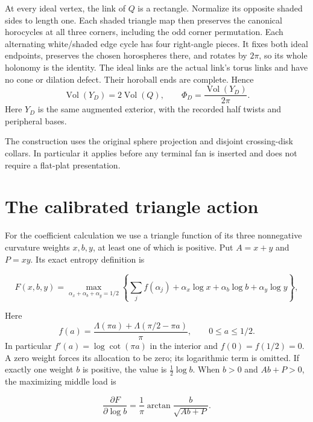 At every ideal vertex, the link of \(Q\) is a rectangle. Normalize its
opposite shaded sides to length one. Each shaded triangle map then
preserves the canonical horocycles at all three corners, including the
odd corner permutation. Each alternating white/shaded edge cycle has
four right-angle pieces. It fixes both ideal endpoints, preserves the
chosen horospheres there, and rotates by \(2\pi\), so its whole holonomy
is the identity. The ideal links are the actual link's torus links and
have no cone or dilation defect. Their horoball ends are complete. Hence
\begin{equation}\label{mcg:eq-4}
\operatorname{Vol}(Y_D)=2\operatorname{Vol}(Q),
       \qquad \Phi_D=\frac{\operatorname{Vol}(Y_D)}{2\pi}.
\end{equation} Here \(Y_D\) is the same augmented exterior, with the recorded half
twists and peripheral bases.

The construction uses the original sphere projection and disjoint
crossing-disk collars. In particular it applies before any terminal fan
is inserted and does not require a flat-plat presentation.

\section{The calibrated triangle action}\label{bl:an-exact-integral-for-the-source-normalized-triangle-action}

For the coefficient calculation we use a triangle function of its
three nonnegative curvature weights $x,b,y$, at least one of which is
positive. Put
\(A=x+y\) and \(P=xy\). Its exact
entropy definition is

\begin{equation}\label{bl:F8}
F(x,b,y)=\max_{\alpha_x+\alpha_b+\alpha_y=1/2}
\left\{\sum_j f(\alpha_j)+\alpha_x\log x+
\alpha_b\log b+\alpha_y\log y\right\},
\end{equation}

Here
\[
 f(a)=\frac{\Lambda(\pi a)+\Lambda(\pi/2-\pi a)}{\pi},
 \qquad0\le a\le1/2.
\]
In particular $f'(a)=\log\cot(\pi a)$ in the interior and
$f(0)=f(1/2)=0$. A zero weight forces its allocation to be zero;
its logarithmic term is omitted. If exactly one weight $b$ is
positive, the value is $\tfrac12\log b$. When $b>0$ and $Ab+P>0$, the maximizing middle load is

\begin{equation}\label{bl:F9}
\frac{\partial F}{\partial\log b}
=\frac1\pi\arctan\frac{b}{\sqrt{Ab+P}}.
\end{equation}

